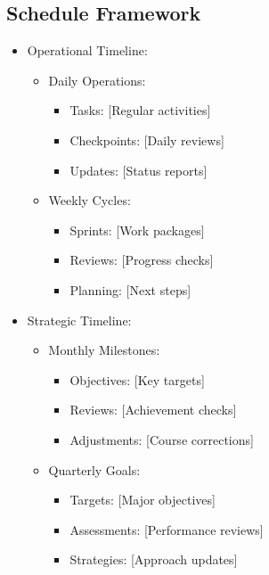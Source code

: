 \documentclass{article}
\begin{document}
\subsection{Schedule Framework}

\begin{itemize}
    \item Operational Timeline:
    \begin{itemize}
        \item Daily Operations:
        \begin{itemize}
            \item Tasks: [Regular activities]
            \item Checkpoints: [Daily reviews]
            \item Updates: [Status reports]
        \end{itemize}
        \item Weekly Cycles:
        \begin{itemize}
            \item Sprints: [Work packages]
            \item Reviews: [Progress checks]
            \item Planning: [Next steps]
        \end{itemize}
    \end{itemize}
    \item Strategic Timeline:
    \begin{itemize}
        \item Monthly Milestones:
        \begin{itemize}
            \item Objectives: [Key targets]
            \item Reviews: [Achievement checks]
            \item Adjustments: [Course corrections]
        \end{itemize}
        \item Quarterly Goals:
        \begin{itemize}
            \item Targets: [Major objectives]
            \item Assessments: [Performance reviews]
            \item Strategies: [Approach updates]
        \end{itemize}
    \end{itemize}
\end{itemize}
\end{document}
